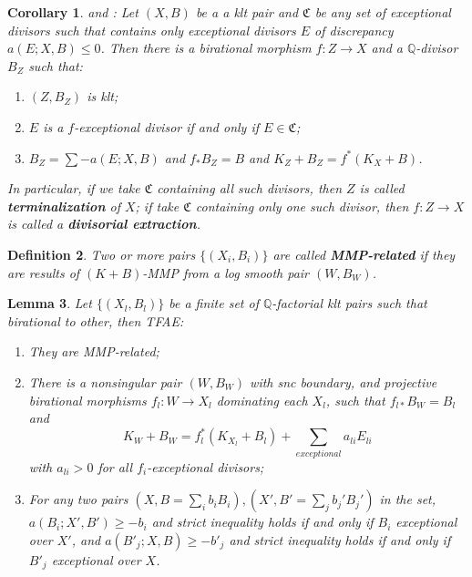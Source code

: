 \documentclass[11pt]{amsart}
\numberwithin{equation}{section}
\newtheorem{defn}{Definition}[subsection]
\newtheorem{lem}[defn]{Lemma}
\newtheorem{cor}[defn]{Corollary}
\newtheorem{rmk}[defn]{Remark}
\begin{document}
\begin{cor}\label{extraction}
  \cite[Corollary 13.7]{haconMinimalModelProgram2012} and \cite[Corollary 1.4.3]{birkarExistenceMinimalModels2009}: Let $ (X,B) $ be a a klt pair and $\mathfrak{C}$ be any set of exceptional divisors such that  contains only exceptional divisors $ E $ of discrepancy $ a(E;X,B)\leqslant 0 $. Then there is a birational morphism $ f:Z\to X $ and a $ \mathbb{Q} $-divisor $ B_Z $ such that:
  \begin{enumerate}
    \item $ (Z,B_Z) $ is klt;
    \item $ E $ is a $f$-exceptional divisor if and only if $ E\in \mathfrak{C} $;
    \item $ B_Z=\sum-a(E;X,B) $ and $ f_*B_Z=B $ and $ K_Z+B_Z=f^*(K_X+B) $.
  \end{enumerate} 
  In particular, if we take $\mathfrak{C}$ containing all such divisors, then $ Z $ is called \textbf{terminalization} of $ X $; if take $\mathfrak{C}$ containing only one such divisor, then $ f:Z\to X $ is called a \textbf{divisorial extraction}.    
\end{cor}

\begin{defn}
  \cite[Definition 3.3]{brunoLogSarkisovProgram1995}
  Two or more pairs $ \{(X_i,B_i)\} $ are called \textbf{MMP-related} if they are results of $ (K+B) $-MMP from a log smooth pair $(W,B_{W})$.
\end{defn}
  
 \begin{lem}\label{MMPrelatedConditation}
  \cite[Proposition 3.4]{brunoLogSarkisovProgram1995}
  Let $ \{(X_l,B_l)\} $ be a finite set of $ \mathbb{Q} $-factorial klt pairs such that birational to other, then TFAE:
  \begin{enumerate}
    \item They are MMP-related;
    \item There is a nonsingular pair $ (W,B_W) $ with snc boundary, and projective birational morphisms $ f_l:W\to  X_l $ dominating each $ X_l $, such that $ f_{l*}B_W=B_l $ and
      \[ K_W+B_W=f_l^*(K_{X_l}+B_l)+\sum_{exceptional}{a_{li}E_{li}} \]
      with $ a_{li}>0 $ for all $ f_i $-exceptional divisors;
    \item For any two pairs $ (X,B=\sum_ib_iB_i),(X',B'=\sum _jb_j'B_j') $ in the set,  $ a(B_i;X',B')\geqslant -b_i $ and strict inequality holds if and only if $ B_i $ exceptional over $ X' $, and $ a(B'_j;X,B)\geqslant -b'_j $ and strict inequality holds if and only if $ B'_j $ exceptional over $ X $.
  \end{enumerate}
\end{lem}
\end{document}
